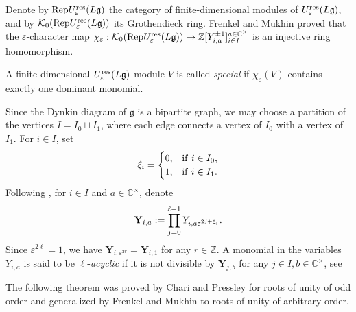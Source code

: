 \documentclass[11pt, reqno]{amsart}
\theoremstyle{plain}
\theoremstyle{definition}
\numberwithin{equation}{section}
\newcommand{\res}{{\rm res}}
\begin{document}
Denote by ${\rm Rep}U_\varepsilon^{\res}({L\mathfrak{g}})$ the category of finite-dimensional modules of $U_\varepsilon^{\res}({L\mathfrak{g}})$, and by $\mathcal{K}_0({\rm Rep}U_\varepsilon^{\res}({L\mathfrak{g}}))$ its Grothendieck ring.
Frenkel and Mukhin {\cite[Theorem 3.2]{FM02}} proved that the $\varepsilon$-character map $\chi_{\varepsilon}: \mathcal{K}_0({\rm Rep} U_\varepsilon^{\res}({L\mathfrak{g}})) \rightarrow \mathbb{Z}[Y_{i,a}^{\pm1}]_{i\in I}^{a\in\mathbb{C^{\times}}}$ is an  injective ring homomorphism. 

A finite-dimensional $U_\varepsilon^{\res}(L\mathfrak{g})$-module $V$ is called \textit{special} if $\chi_{\varepsilon}(V)$ contains exactly one dominant monomial. 


Since the Dynkin diagram of $\mathfrak{g}$ is a bipartite graph, we may choose a partition of the vertices $I=I_0\sqcup I_1$, where each edge connects a vertex of $I_0$ with a vertex of $I_1$. For $i\in I$, set
\begin{align}\label{Def: xi_i}
\xi_i=
\begin{cases} 0, & \text{if}{\hskip 0.4em} i\in I_0,\\
              1, & \text{if}{\hskip 0.4em} i\in I_1.
\end{cases}
\end{align}
Following \cite{FM02}, for $i\in I$ and $a\in \mathbb{C^{\times}}$, denote
\begin{align}\label{mathbf{Y}}
\mathbf{Y}_{i,a}:=\prod_{j=0}^{\ell-1} Y_{i,a\varepsilon^{2j+\xi_i}}.
\end{align}
Since $\varepsilon^{2\ell}=1$, we have $\mathbf{Y}_{i,\varepsilon^{2r}}=\mathbf{Y}_{i,1}$ for any $r\in \mathbb{Z}$. A monomial in the variables $Y_{i,a}$ is said to be $\ell$-\textit{acyclic} if it is not divisible by $\mathbf{Y}_{j,b}$ for any $j \in I, b\in \mathbb{C}^{\times}$, see \cite[Section 2.6]{FM02}



The following theorem was proved by Chari and Pressley \cite{CP97} for roots of unity of odd order and generalized by Frenkel and Mukhin \cite{FM02} to roots of unity of arbitrary order.
\end{document}
